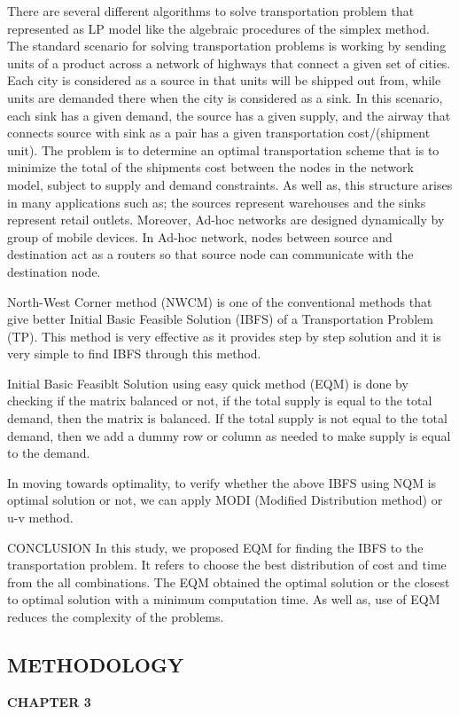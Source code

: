 \documentclass{article}
\begin{document}
There are several different algorithms to solve transportation problem that represented as LP model like the algebraic procedures of the simplex method. The standard scenario for solving transportation problems is working by sending units of a product across
a network of highways that connect a given set of cities. Each city is considered as a source in that units will be shipped out from, while units are demanded there when the city is considered as a sink. In this scenario, each sink has a given demand, the
source has a given supply, and the airway that connects source with sink as a pair has a given transportation cost/(shipment unit). The problem is to determine an optimal transportation scheme that is to minimize the
total of the shipments cost between the nodes in the network model, subject to supply and demand constraints. As well as, this structure arises in many applications such as; the sources represent warehouses
and the sinks represent retail outlets. Moreover, Ad-hoc networks are designed dynamically by group of mobile devices. In Ad-hoc network, nodes between source and destination act as a routers so that source node can communicate with the destination node.

North-West Corner method (NWCM) is one of the conventional methods that give better Initial Basic Feasible Solution (IBFS) of a Transportation Problem (TP). This method is very effective as it provides step by step solution and it is very simple to find IBFS through this method.

Initial Basic Feasiblt Solution using easy quick method (EQM) is done by checking if the matrix balanced or not, if the total supply is equal to the total demand, then the matrix is balanced. If the total supply is not equal to the total demand, then we add a dummy row or column as needed to make supply is equal to the demand.

In moving towards optimality, to verify whether the above IBFS using NQM is optimal solution or not, we can apply MODI (Modified Distribution method) or u-v method. \break

\noindent CONCLUSION \break
In this study, we proposed EQM for finding the IBFS to the transportation problem. It refers to choose the best distribution of cost and time from the all combinations. The EQM obtained the optimal solution or the closest to optimal solution with a minimum computation time. As well as, use of EQM reduces the complexity of the problems.

\newpage

\begin{center}
	\section{METHODOLOGY}
	\textbf{CHAPTER 3}
\end{center}
\end{document}
